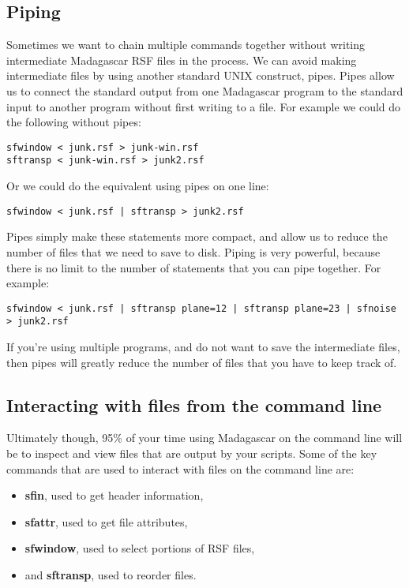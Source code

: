 \subsection{Piping}
Sometimes we want to chain multiple commands together without writing intermediate Madagascar RSF files in the process. We can avoid making intermediate files by using another standard UNIX construct, pipes. Pipes allow us to connect the standard output from one Madagascar program to the standard input to another program without first writing to a file. For example we could do the following without pipes:
\begin{verbatim}
sfwindow < junk.rsf > junk-win.rsf
sftransp < junk-win.rsf > junk2.rsf
\end{verbatim}
Or we could do the equivalent using pipes on one line:
\begin{verbatim}
sfwindow < junk.rsf | sftransp > junk2.rsf
\end{verbatim}
Pipes simply make these statements more compact, and allow us to reduce the number of files that we need to save to disk.  Piping is very powerful, because there is no limit to the number of statements that you can pipe together.  For example:

\begin{verbatim}
sfwindow < junk.rsf | sftransp plane=12 | sftransp plane=23 | sfnoise > junk2.rsf 
\end{verbatim}
If you're using multiple programs, and do not want to save the intermediate files, then pipes will greatly reduce the number of files that you have to keep track of.  

\subsection{Interacting with files from the command line}

Ultimately though, 95\% of your time using Madagascar on the command line will be to inspect and view files that are output by your scripts. Some of the key commands that are used to interact with files on the command line are:

\begin{itemize}
\item \textbf{sfin}, used to get header information,
\item \textbf{sfattr}, used to get file attributes,
\item \textbf{sfwindow}, used to select portions of RSF files,
\item and \textbf{sftransp}, used to reorder files.
\end{itemize}

